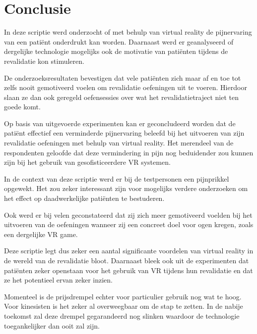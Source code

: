 
\chapter{Conclusie}
\label{ch:conclusie}


In deze scriptie werd onderzocht of met behulp van virtual reality de pijnervaring van een patiënt onderdrukt kan worden. Daarnaast werd er geanalyseerd of dergelijke technologie mogelijks ook de motivatie van patiënten tijdens de revalidatie kon stimuleren.

De onderzoeksresultaten bevestigen dat vele patiënten zich maar af en toe tot zelfs nooit gemotiveerd voelen om revalidatie oefeningen uit te voeren. Hierdoor slaan ze dan ook geregeld oefensessies over wat het revalidatietraject niet ten goede komt.

Op basis van uitgevoerde experimenten kan er geconcludeerd worden dat de patiënt effectief een verminderde pijnervaring beleefd bij het uitvoeren van zijn revalidatie oefeningen met behulp van virtual reality. Het merendeel van de respondenten geloofde dat deze vermindering in pijn nog beduidender zou kunnen zijn bij het gebruik van gesofisticeerdere VR systemen.

In de context van deze scriptie werd er bij de testpersonen een pijnprikkel opgewekt. Het zou zeker interessant zijn voor mogelijks verdere onderzoeken om het effect op daadwerkelijke patiënten te bestuderen.

Ook werd er bij velen geconstateerd dat zij zich meer gemotiveerd voelden bij het uitvoeren van de oefeningen wanneer zij een concreet doel voor ogen kregen, zoals een dergelijke VR game.

Deze scriptie legt dus zeker een aantal significante voordelen van virtual reality in de wereld van de revalidatie bloot. Daarnaast bleek ook uit de experimenten dat patiënten zeker openstaan voor het gebruik van VR tijdens hun revalidatie en dat ze het potentieel ervan zeker inzien.

Momenteel is de prijsdrempel echter voor particulier gebruik nog wat te hoog. Voor kinesisten is het zeker al overweegbaar om de stap te zetten. In de nabije toekomst zal deze drempel gegarandeerd nog slinken waardoor de technologie toegankelijker dan ooit zal zijn.


